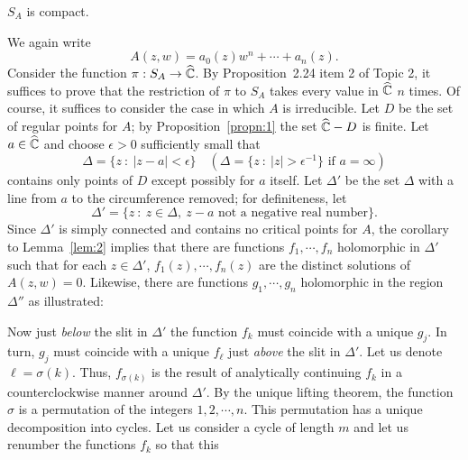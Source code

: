 \documentclass[a4paper,11pt]{article}
\begin{document}
\begin{thm}
  \label{thm:2}
  $S_A$ is compact.
\end{thm}

\begin{myproof}
  We again write
  $$
  A(z,w) = a_0(z) w^n + \cdots + a_n(z).
  $$
  Consider the function $\pi : S_A \to \widehat{{\mathbb C}}$.  By
  Proposition~2.24 item 2 of Topic 2, it suffices to prove that the
  restriction of $\pi$ to $S_A$ takes every value in $\widehat{{\mathbb C}}$
  $n$ times.  Of course, it suffices to consider the case in which $A$
  is irreducible.  Let $D$ be the set of regular points for $A$; by
  Proposition~\ref{propn:1} the set $\widehat{{\mathbb C}}-D$ is finite.  Let
  $a \in \widehat{{\mathbb C}}$ and choose $\epsilon>0$ sufficiently small
  that
  $$
  \Delta = \{ z ~:~ |z-a|<\epsilon \}\quad
  (\Delta = \{z ~:~ |z| > \epsilon^{-1}\} \text{ if }a=\infty)
  $$
  contains only points of $D$ except possibly for $a$ itself.  Let
  $\Delta'$ be the set $\Delta$ with a line from $a$ to the
  circumference removed; for definiteness, let
  $$
  \Delta' = \{ z ~:~ z \in \Delta,\ z-a \text{ not a negative real
    number} \}.
  $$
  Since $\Delta'$ is simply connected and contains no critical points
  for $A$, the corollary to Lemma~\ref{lem:2} implies that there are
  functions $f_1, \cdots, f_n$ holomorphic in $\Delta'$ such that for
  each $z \in \Delta'$, $f_1(z), \cdots, f_n(z)$ are the distinct
  solutions of $A(z,w) = 0$.
  Likewise, there are functions $g_1, \cdots, g_n$ holomorphic in the
  region $\Delta''$ as illustrated:
  \begin{center}
  \end{center}
  Now just \emph{below} the slit in $\Delta'$ the function $f_k$ must
  coincide with a unique $g_j$.  In turn, $g_j$ must coincide with a
  unique $f_\ell$ just \emph{above} the slit in $\Delta'$.  Let us
  denote $\ell = \sigma(k)$.  Thus, $f_{\sigma(k)}$ is the result of
  analytically continuing $f_k$ in a counterclockwise manner around
  $\Delta'$.  By the unique lifting theorem, the function $\sigma$ is
  a permutation of the integers $1, 2, \cdots, n$.  This permutation
  has a unique decomposition into cycles.  Let us consider a cycle of
  length $m$ and let us renumber the functions $f_k$ so that this

\end{myproof}
\end{document}
